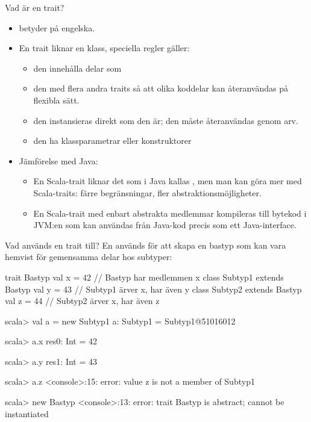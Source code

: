 \begin{Slide}{Vad är en trait?}
\begin{itemize}
\item {} betyder  på engelska.

\item En trait liknar en klass,  speciella regler gäller:  

\begin{itemize}

\item den  innehålla delar som 

\item den  med flera andra traits så att olika koddelar kan återanvändas på flexibla sätt. 

\item den  instansieras direkt som den är; den måste återanvändas genom arv.

\item den  ha klassparametrar eller konstruktorer
\end{itemize}

\pause
\item {\SlideFontSmall Jämförelse med Java:} 
\begin{itemize}\SlideFontTiny
\item En Scala-trait liknar det som i Java kallas , men man kan göra mer med Scala-traits: färre begränsningar, fler abstraktionsmöjligheter.

\item En Scala-trait med enbart abstrakta medlemmar kompileras till bytekod i JVM:en som kan användas från Java-kod precis som ett Java-interface.
\end{itemize}
\end{itemize}

\end{Slide}

\begin{Slide}{Vad används en trait till?}
En  används för att skapa en bastyp som kan vara hemvist för gemensamma delar hos subtyper:
\begin{Code}
trait Bastyp { val x = 42 }                 // Bastyp har medlemmen x
class Subtyp1 extends Bastyp { val y = 43 } // Subtyp1 ärver x, har även y
class Subtyp2 extends Bastyp { val z = 44 } // Subtyp2 ärver x, har även z
\end{Code}
\pause\vspace{-0.5em}
\begin{REPL}
scala> val a = new Subtyp1
a: Subtyp1 = Subtyp1@51016012

scala> a.x
res0: Int = 42

scala> a.y
res1: Int = 43

scala> a.z
<console>:15: error: value z is not a member of Subtyp1

scala> new Bastyp
<console>:13: error: trait Bastyp is abstract; cannot be instantiated
\end{REPL}

\end{Slide}


